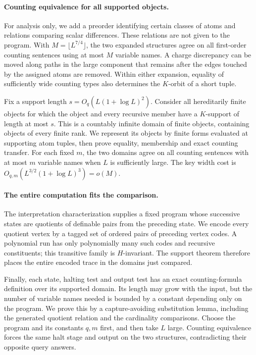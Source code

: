 \paragraph{Counting equivalence for all supported objects.}
For analysis only, we add a preorder identifying certain classes of
atoms and relations comparing scalar differences. These relations are
not given to the program. With
$M=\lfloor L^{7/4}\rfloor$, the two expanded structures agree on all
first-order counting sentences using at most $M$ variable names. A
charge discrepancy can be moved along paths in the large component that
remains after the edges touched by the assigned atoms are removed.
Within either expansion, equality of sufficiently wide counting types
also determines the $K$-orbit of a short tuple.

Fix a support length $s=O_q(L(1+\log L)^2)$. Consider all hereditarily
finite objects for which the object and every recursive member have a
$K$-support of length at most $s$. This is a countably infinite domain of
finite objects, containing objects of every finite rank. We represent
its objects by finite forms evaluated at supporting atom tuples, then
prove equality, membership and exact counting transfer. For each fixed
$m$, the two domains agree on all counting sentences with at most $m$
variable names when $L$ is sufficiently large. The key width cost is
$O_{q,m}(L^{3/2}(1+\log L)^3)=o(M)$.

\paragraph{The entire computation fits the comparison.}
The interpretation characterization supplies a fixed program whose
successive states are quotients of definable pairs from the preceding
state. We encode every quotient vertex by a tagged set of ordered pairs
of preceding vertex codes. A polynomial run has only polynomially many
such codes and recursive constituents; this transitive family is
$H$-invariant. The support theorem therefore places the entire encoded
trace in the domains just compared.

Finally, each state, halting test and output test has an exact
counting-formula definition over its supported domain. Its length may
grow with the input, but the number of variable names needed is bounded
by a constant depending only on the program. We prove this by a
capture-avoiding substitution lemma, including the generated quotient
relation and the cardinality comparisons. Choose the program and its
constants $q,m$ first, and then take $L$ large. Counting equivalence
forces the same halt stage and output on the two structures, contradicting
their opposite query answers.


